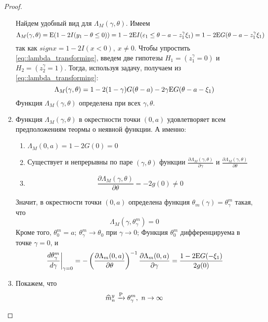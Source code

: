 \begin{example}
\begin{proof}
\begin{enumerate}
            Найдем удобный вид для $\Lambda_M(\gamma,\theta)$. Имеем
            \begin{equation} \label{eq::lambda_transforming}
                \Lambda_M(\gamma,\theta)=\mathrm{E}(1-2I(y_1-\theta\leq0))=1-2\mathrm{E} I(\varepsilon_1\leq\theta-a-z_1^\gamma\xi_1)=
                1-2\mathrm{E} G(\theta-a-z_1^\gamma\xi_1)
            \end{equation}
            так как $signx=1-2I(x<0),\ x\neq0$. Чтобы упростить \eqref{eq::lambda_transforming},
            введем две гипотезы $H_1=(z_1^\gamma=0)$ и $H_2=(z_2^\gamma=1)$.
            Тогда, используя задачу, получаем из \eqref{eq::lambda_transforming}:
            \[\Lambda_M(\gamma,\theta)=1-2(1-\gamma)G(\theta-a)-2\gamma\mathrm{E} G(\theta-a-\xi_1)\]
            Функция $\Lambda_M(\gamma,\theta)$ определена при всех $\gamma,\theta$.
            \item Функция $\Lambda_M(\gamma,\theta)$ в окрестности точки $(0,a)$ удовлетворяет
            всем предположениям теормы о неявной функции. А именно:
            \begin{enumerate}
                \item $\Lambda_M(0,a)=1-2G(0)=0$
                \item Существует и непрерывны по паре $(\gamma,\theta)$ функции
                $\frac{\partial\Lambda_M(\gamma,\theta)}{\partial\gamma}$ и $\frac{\partial\Lambda_M(\gamma,\theta)}{\partial\theta}$ 
                \item $$\frac{\partial\Lambda_M(\gamma,\theta)}{\partial\theta}=-2g(0)\neq0$$
            \end{enumerate}
            Значит, в окрестности точки $(0,a)$ определена функция $\theta_m(\gamma)=\theta_\gamma^m$ такая, что
            \[\Lambda_M(\gamma,\theta_\gamma^m)=0\]
            Кроме того, $\theta_0^m=a;\ \theta_\gamma^m\rightarrow\theta_0$ при $\gamma\rightarrow0$;
            Функция $\theta_0^m$ дифференцируема в точке $\gamma=0$, и
            \begin{equation} \label{eq::theta_func_derivative}
                \left.\frac{d\theta_\gamma^m}{d\gamma}\right\rvert_{\gamma=0}=-\left(\frac{\partial\Lambda_m(0,a)}{\partial\theta}\right)^{-1}\frac{\partial\Lambda_m(0,a)}{\partial\gamma}=\frac{1-2\mathrm{E} G(-\xi_1)}{2g(0)}
            \end{equation}
            \item Покажем, что
            \begin{equation} \label{eq::sample_median_p_conv}
                \widehat{m}_n^y\xrightarrow{\P}\theta_\gamma^m,\ n\rightarrow\infty

\end{equation}
\end{enumerate}
\end{proof}
\end{example}
